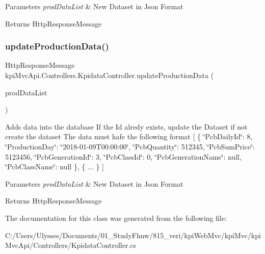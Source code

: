 \begin{DoxyParams}{Parameters}
{\em prod\+Data\+List} & New Dataset in Json Format \\
\hline
\end{DoxyParams}
\begin{DoxyReturn}{Returns}
{\ttfamily Http\+Response\+Message} 
\end{DoxyReturn}
\mbox{\label{classkpi_mvc_api_1_1_controllers_1_1_kpidata_controller_a82f308e9ae4809dfdca3ce685af05774}} 
\subsubsection{\texorpdfstring{update\+Production\+Data()}{updateProductionData()}\hspace{0.1cm}{\footnotesize\ttfamily [2/2]}}
{\footnotesize\ttfamily Http\+Response\+Message kpi\+Mvc\+Api.\+Controllers.\+Kpidata\+Controller.\+update\+Production\+Data (\begin{DoxyParamCaption}\item[{List$<$ \hyperlink{classkpi_mvc_api_1_1_data_transfer_objects_1_1_production_data_dto}{Production\+Data\+Dto} $>$}]{prod\+Data\+List }\end{DoxyParamCaption})\hspace{0.3cm}{\ttfamily [inline]}}



Adds data into the database If the Id alredy exists, update the Dataset if not create the dataset The data must hafe the following format \mbox{[} \{ \char`\"{}\+Pcb\+Daily\+Id\char`\"{}\+: 8, \char`\"{}\+Production\+Day\char`\"{}\+: \char`\"{}2018-\/01-\/09\+T00\+:00\+:00\char`\"{}, \char`\"{}\+Pcb\+Quantity\char`\"{}\+: 512345, \char`\"{}\+Pcb\+Sum\+Price\char`\"{}\+: 5123456, \char`\"{}\+Pcb\+Generation\+Id\char`\"{}\+: 3, \char`\"{}\+Pcb\+Class\+Id\char`\"{}\+: 0, \char`\"{}\+Pcb\+Generation\+Name\char`\"{}\+: null, \char`\"{}\+Pcb\+Class\+Name\char`\"{}\+: null \}, \{ ... \} \mbox{]} 


\begin{DoxyParams}{Parameters}
{\em prod\+Data\+List} & New Dataset in Json Format \\
\hline
\end{DoxyParams}
\begin{DoxyReturn}{Returns}
{\ttfamily Http\+Response\+Message} 
\end{DoxyReturn}


The documentation for this class was generated from the following file\+:\begin{DoxyCompactItemize}
\item 
C\+:/\+Users/\+Ulysses/\+Documents/01\+\_\+\+Study\+Fhnw/815\+\_\+veri/kpi\+Web\+Mvc/kpi\+Mvc/kpi\+Mvc\+Api/\+Controllers/Kpidata\+Controller.\+cs\end{DoxyCompactItemize}

